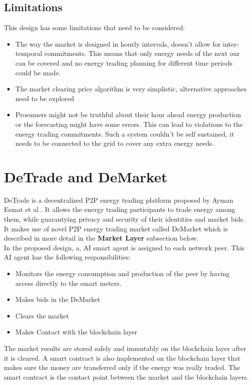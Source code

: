 \subsection{Limitations}
This design has some limitations that need to be considered:
\begin{itemize}
    \item The way the market is designed in hourly intervals, doesn't allow for inter-temporal commitments. This means that only energy needs of the next our can be covered
          and no energy trading planning for different time periods could be made.
    \item The market clearing price algorithm is very simplistic, alternative approaches need to be explored
    \item Prosumers might not be truthful about their hour ahead energy production or the forecasting might have some errors. This can lead to violations to the energy trading
          commitments. Such a system couldn't be self sustained, it needs to be connected to the grid to cover any extra energy needs.
\end{itemize}

\section{DeTrade and DeMarket}
\label{sec:dtr}
DeTrade is a decentralized P2P energy trading platform proposed by Ayman Esmat et al \cite{DeTrade}. It allows the energy trading participants to trade energy among them, while guarantying privacy
and security of their identities and market bids. It makes use of novel P2P energy trading market called DeMarket which is described in more detail in the \textbf{Market Layer}
subsection below.\\
In the proposed design, a, AI smart agent is assigned to each network peer. This AI agent has the following responsibilities:
\begin{itemize}
    \item Monitors the energy consumption and production of the peer by having access directly to the smart meters.
    \item Makes bids in the DeMarket
    \item Clears the market
    \item Makes Contact with the blockchain layer
\end{itemize}
The market results are stored safely and immutably on the blockchain layer after it is cleared. A smart contract is also implemented on the blockchain layer that makes sure the money
are transferred only if the energy was really traded. The smart contract is the contact point between the market and the blockchain layers.
\cite{DeTrade}

